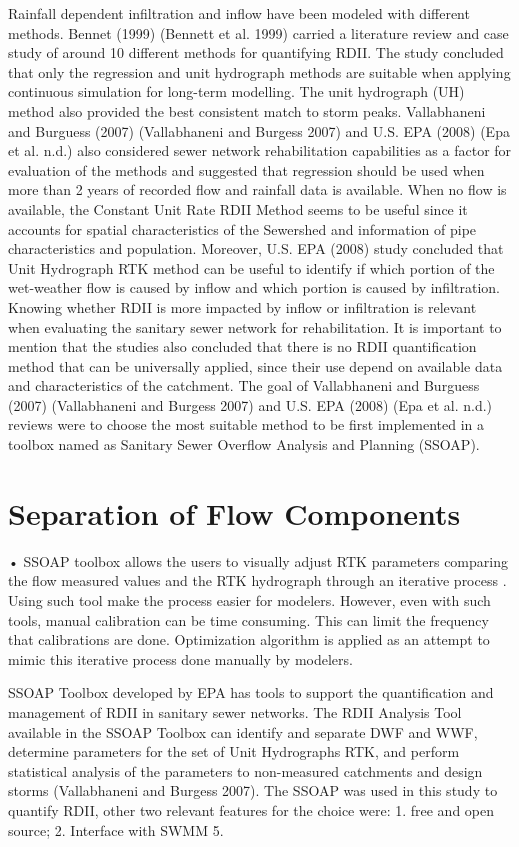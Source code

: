 Rainfall dependent infiltration and inflow have been modeled with different methods. Bennet (1999) (Bennett et al. 1999) carried a literature review and case study of around 10 different methods for quantifying RDII. 
The study concluded that only the regression and unit hydrograph methods are suitable when applying continuous simulation for long-term modelling. The unit hydrograph (UH) method also provided the best consistent match to storm peaks. Vallabhaneni and Burguess (2007) (Vallabhaneni and Burgess 2007) and U.S. EPA (2008) (Epa et al. n.d.) also considered sewer network rehabilitation capabilities as a factor for evaluation of the methods and suggested that regression should be used when more than 2 years of recorded flow and rainfall data is available. When no flow is available, the Constant Unit Rate RDII Method seems to be useful since it accounts for spatial characteristics of the Sewershed and information of pipe characteristics and population. Moreover, U.S. EPA (2008) study concluded that Unit Hydrograph RTK method can be useful to identify if which portion of the wet-weather flow is caused by inflow and which portion is caused by infiltration. Knowing whether RDII is more impacted by inflow or infiltration is relevant when evaluating the sanitary sewer network for rehabilitation. 
It is important to mention that the studies also concluded that there is no RDII quantification method that can be universally applied, since their use depend on available data and characteristics of the catchment. The goal of Vallabhaneni and Burguess (2007) (Vallabhaneni and Burgess 2007) and U.S. EPA (2008) (Epa et al. n.d.) reviews were to choose the most suitable method to be first implemented in a toolbox named as Sanitary Sewer Overflow Analysis and Planning (SSOAP). 


\section{Separation of Flow Components}

•	SSOAP toolbox allows the users to visually adjust RTK parameters comparing the flow measured values and the RTK hydrograph through an iterative process \cite{Vallabhaneni2007}. Using such tool make the process easier for modelers. However, even with such tools, manual calibration can be time consuming. This can limit the frequency that calibrations are done. Optimization algorithm is applied as an attempt to mimic this iterative process done manually by modelers.

SSOAP Toolbox developed by \ac{EPA} has tools to support the quantification and management of RDII in sanitary sewer networks. The RDII Analysis Tool available in the SSOAP Toolbox can identify and separate DWF and WWF, determine parameters for the set of Unit Hydrographs RTK, and perform statistical analysis of the parameters to non-measured catchments and design storms (Vallabhaneni and Burgess 2007). The SSOAP was used in this study to quantify RDII, other two relevant features for the choice were: 1. free and open source; 2. Interface with SWMM 5.


